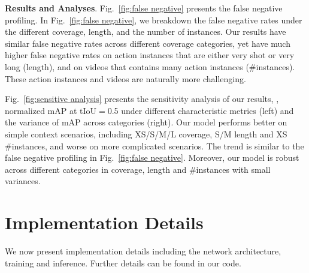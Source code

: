 \noindent \textbf{Results and Analyses}. Fig.\ \ref{fig:false negative} presents the false negative profiling. In Fig.\ \ref{fig:false negative}, we breakdown the false negative rates under the different coverage, length, and the number of instances. Our results have similar false negative rates across different coverage categories, yet have much higher false negative rates on action instances that are either very shot or very long (length), and on videos that contains many action instances (\#instances). These action instances and videos are naturally more challenging. 

Fig.\ \ref{fig:sensitive analysis} presents the sensitivity analysis of our results, \ie, normalized mAP at tIoU$=$0.5 under different characteristic metrics (left) and the variance of mAP across categories (right). Our model performs better on simple context scenarios, including XS/S/M/L coverage, S/M length and XS \#instances, and worse on more complicated scenarios. The trend is similar to the false negative profiling in Fig.\ \ref{fig:false negative}. Moreover, our model is robust across different categories in coverage, length and \#instances with small variances. 

\section{Implementation Details}\label{sec:appendix:details}
We now present implementation details including the network architecture, training and inference. Further details can be found in our code.

